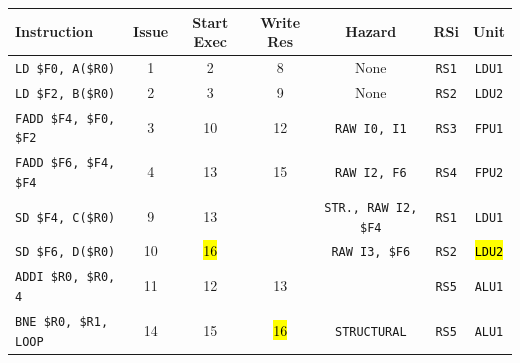 \begin{enumerate}
    \begin{table}[!htp]
        \centering
        \begin{adjustbox}{width={\textwidth},totalheight={\textheight},keepaspectratio}
        \begin{tabular}{@{} l c c c c c c @{}}
            \toprule
            \textbf{Instruction} & \textbf{Issue} & \textbf{Start Exec} & \textbf{Write Res} & \textbf{Hazard} & \textbf{RSi} & \textbf{Unit} \\
            \midrule
            \texttt{LD \$F0, A(\$R0)}       & 1 & 2 & 8 & None  & \texttt{RS1}   & \texttt{LDU1}  \\ [.5em]
            \texttt{LD \$F2, B(\$R0)}       & 2 & 3 & 9 & None  & \texttt{RS2}   & \texttt{LDU2}  \\ [.5em]
            \texttt{FADD \$F4, \$F0, \$F2}  & 3 & 10 & 12 & \texttt{RAW I0, I1} & \texttt{RS3} & \texttt{FPU1} \\ [.5em]
            \texttt{FADD \$F6, \$F4, \$F4}  & 4 & 13 & 15 & \texttt{RAW I2, F6} & \texttt{RS4} & \texttt{FPU2} \\ [.5em]
            \texttt{SD \$F4, C(\$R0)}       & 9 & 13 &   & \texttt{STR., RAW I2, \$F4} & \texttt{RS1} & \texttt{LDU1} \\ [.5em]
            \texttt{SD \$F6, D(\$R0)}       & 10 & \hl{16} &   & \texttt{RAW I3, \$F6} & \texttt{RS2} & \hl{\texttt{LDU2}} \\ [.5em]
            \texttt{ADDI \$R0, \$R0, 4}     & 11 & 12 & 13 &       & \texttt{RS5} & \texttt{ALU1} \\ [.5em]
            \texttt{BNE \$R0, \$R1, LOOP}   & 14 & 15 & \hl{16} & \texttt{STRUCTURAL} & \texttt{RS5} & \texttt{ALU1} \\
            \bottomrule
        \end{tabular}
        \end{adjustbox}
    \end{table}
    

\end{enumerate}
